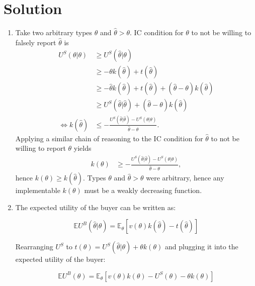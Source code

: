 \documentclass[a4paper]{article}
\newif\ifsolutions
\begin{document}
\ifsolutions
\section*{Solution}
\begin{enumerate}
	\item Take two arbitrary types $\theta$ and $\hat{\theta}>\theta$. IC condition for $\theta$ to not be willing to falsely report $\hat{\theta}$ is
	\begin{align*}
		U^S(\theta|\theta) &\geq U^S (\hat{\theta}|\theta)
		\\
		&\geq -\theta k(\hat{\theta}) + t(\hat{\theta})
		\\
		&\geq -\hat{\theta} k(\hat{\theta}) + t(\hat{\theta}) + (\hat{\theta}-\theta) k(\hat{\theta})
		\\
		&\geq U^S (\hat{\theta}|\hat{\theta}) + (\hat{\theta}-\theta) k(\hat{\theta})
		\\
		\iff k(\hat{\theta}) &\leq - \frac{U^S(\hat{\theta}|\hat{\theta})-U^S(\theta|\theta)}{\hat{\theta}-\theta}.
	\end{align*}
	Applying a similar chain of reasoning to the IC condition for $\hat{\theta}$ to not be willing to report $\theta$ yields
	\begin{align*}
		k({\theta}) &\geq - \frac{U^S(\hat{\theta}|\hat{\theta})-U^S(\theta|\theta)}{\hat{\theta}-\theta},
	\end{align*}
	hence $k(\theta) \geq k(\hat{\theta})$. Types $\theta$ and $\hat{\theta}>\theta$ were arbitrary, hence any implementable $k(\theta)$ must be a weakly decreasing function.
	
	
	\item The expected utility of the buyer can be written as:
	
	$$ \mathbb{E}U^B(\hat{\theta}|\theta)=\mathbb{E}_\theta[v(\theta)k(\hat{\theta})-t(\hat{\theta})]$$
	
	Rearranging $U^S$ to $t(\theta)=U^S(\hat{\theta}|\theta)+\theta k(\theta)$ and plugging it into the expected utility of the buyer:
	
	$$ \mathbb{E}U^B(\theta)=\mathbb{E}_\theta[v(\theta)k(\theta)-U^S(\theta)-\theta k(\theta)]$$
	

\end{enumerate}
\end{document}
